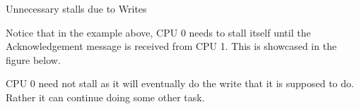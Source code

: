 \documentclass[notes, xcolor = dvipsnames]{beamer}
\begin{document}
    \begin{frame}{Unnecessary stalls due to Writes}

        Notice that in the example above, CPU 0 needs to stall itself until the Acknowledgement message is received from CPU 1.
        This is showcased in the figure below.

        \begin{figure}
        \end{figure}

        CPU 0 need not stall as it will eventually do the write that it is supposed to do. 
        Rather it can continue doing some other task.

    \end{frame}
\end{document}

